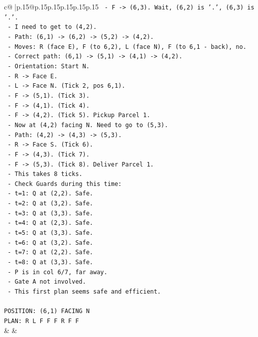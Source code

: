 \documentclass{article}
\begin{document}
{\begin{supertabular}{c@{$\;$}|p{.15\linewidth}@{}p{.15\linewidth}p{.15\linewidth}p{.15\linewidth}p{.15\linewidth}p{.15\linewidth}}
{{{\texttt{  {-} F {-}> (6,3). Wait, (6,2) is '.', (6,3) is '.'.} \\
\texttt{  {-} I need to get to (4,2).} \\
\texttt{  {-} Path: (6,1) {-}> (6,2) {-}> (5,2) {-}> (4,2).} \\
\texttt{  {-} Moves: R (face E), F (to 6,2), L (face N), F (to 6,1 {-} back), no.} \\
\texttt{  {-} Correct path: (6,1) {-}> (5,1) {-}> (4,1) {-}> (4,2).} \\
\texttt{  {-} Orientation: Start N.} \\
\texttt{  {-} R {-}> Face E.} \\
\texttt{  {-} L {-}> Face N. (Tick 2, pos 6,1).} \\
\texttt{  {-} F {-}> (5,1). (Tick 3).} \\
\texttt{  {-} F {-}> (4,1). (Tick 4).} \\
\texttt{  {-} F {-}> (4,2). (Tick 5). Pickup Parcel 1.} \\
\texttt{  {-} Now at (4,2) facing N. Need to go to (5,3).} \\
\texttt{  {-} Path: (4,2) {-}> (4,3) {-}> (5,3).} \\
\texttt{  {-} R {-}> Face S. (Tick 6).} \\
\texttt{  {-} F {-}> (4,3). (Tick 7).} \\
\texttt{  {-} F {-}> (5,3). (Tick 8). Deliver Parcel 1.} \\
\texttt{  {-} This takes 8 ticks.} \\
\texttt{  {-} Check Guards during this time:} \\
\texttt{    {-} t=1: Q at (2,2). Safe.} \\
\texttt{    {-} t=2: Q at (3,2). Safe.} \\
\texttt{    {-} t=3: Q at (3,3). Safe.} \\
\texttt{    {-} t=4: Q at (2,3). Safe.} \\
\texttt{    {-} t=5: Q at (3,3). Safe.} \\
\texttt{    {-} t=6: Q at (3,2). Safe.} \\
\texttt{    {-} t=7: Q at (2,2). Safe.} \\
\texttt{    {-} t=8: Q at (3,3). Safe.} \\
\texttt{    {-} P is in col 6/7, far away.} \\
\texttt{  {-} Gate A not involved.} \\
\texttt{  {-} This first plan seems safe and efficient.} \\
\\ 
\texttt{POSITION: (6,1) FACING N} \\
\texttt{PLAN: R L F F F R F F} \\
            }
        }
    }
    & & \\ \\


\end{supertabular}}
\end{document}
